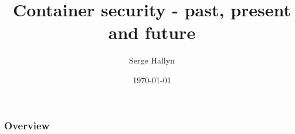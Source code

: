 \documentclass{beamer}
\title[Container Security]{Container security - past, present and future} %
\author{Serge Hallyn} %
\institute[Canonical] %
{
Canonical, Inc \\ %
\medskip
\textit{serge.hallyn@ubuntu.com} %
}
\date{\today} %
\begin{document}
\begin{frame}
\titlepage %
\end{frame}

\begin{frame}
\frametitle{Overview} %
\tableofcontents %
\end{frame}


\end{document}

